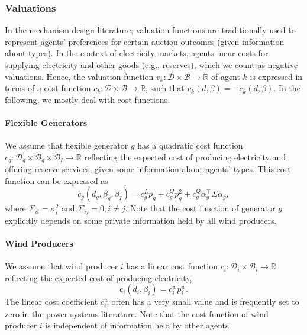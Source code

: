 \documentclass{article}
\begin{document}
\subsubsection{Valuations}

In the mechanism design literature, valuation functions are traditionally used to represent agents' preferences for certain auction outcomes (given information about types). In the context of electricity markets, agents incur costs for supplying electricity and other goods (e.g., reserves), which we count as negative valuations. Hence, the valuation function $v_k: \mathcal{D} \times \mathcal{B} \rightarrow \mathbb{R}$ of agent $k$ is expressed in terms of a cost function $c_k: \mathcal{D} \times \mathcal{B} \rightarrow \mathbb{R}$, such that $v_k(d, \beta) = -c_k(d, \beta)$. In the following, we mostly deal with cost functions.  

\paragraph{Flexible Generators} We assume that flexible generator $g$ has a quadratic cost function $c_g: \mathcal{D}_g \times \mathcal{B}_g \times \mathcal{B}_I \rightarrow \mathbb{R}$ reflecting the expected cost of producing electricity and offering reserve services, given some information about agents' types. This cost function can be expressed as
\begin{equation*}
c_g(d_g, \beta_g, \beta_I) = c_g^L p_g + c_g^Q p_g^2 + c_g^Q \alpha_g^\top \Sigma \alpha_g,
\end{equation*}
where $\Sigma_{ii} = \sigma_i^2$ and $\Sigma_{ij} = 0, i \ne j$. Note that the cost function of generator $g$ explicitly depends on some private information held by all wind producers.

\paragraph{Wind Producers} We assume that wind producer $i$ has a linear cost function $c_i: \mathcal{D}_i \times \mathcal{B}_i \rightarrow \mathbb{R}$ reflecting the expected cost of producing electricity,
\begin{equation*}
c_i(d_i, \beta_i) = c_i^w p_i^w.
\end{equation*}
The linear cost coefficient $c_i^w$ often has a very small value and is frequently set to zero in the power systems literature. Note that the cost function of wind producer $i$ is independent of information held by other agents.
\end{document}
